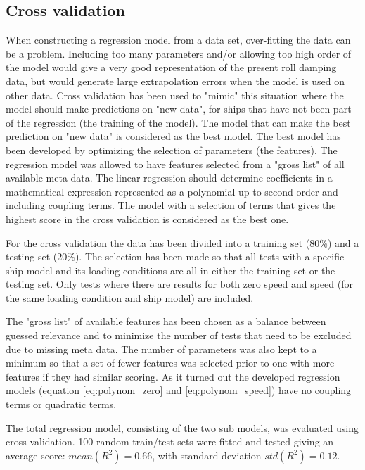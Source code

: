 


\subsection{Cross validation}
When constructing a regression model from a data set, over-fitting the data can be a problem. Including too many parameters and/or allowing too high order of the model would give a very good representation of the present roll damping data, but would generate large extrapolation errors when the model is used on other data. Cross validation has been used to "mimic" this situation where the model should make predictions on "new data", for ships that have not been part of the regression (the training of the model). The model that can make the best prediction on "new data" is considered as the best model. The best model has been developed by optimizing the selection of parameters (the features). The regression model was allowed to have features selected from a "gross list" of all available meta data. The linear regression should determine coefficients in a mathematical expression represented as a polynomial up to second order and including coupling terms. The model with a selection of terms that gives the highest score in the cross validation is considered as the best one.    

For the cross validation the data has been divided into a  training set (80\%) and a testing set (20\%). The selection has been made so that all tests with a specific ship model and its loading conditions are all in either the training set or the testing set. Only tests where there are results for both zero speed and speed (for the same loading condition and ship model) are included.

The "gross list" of available features has been chosen as a balance between guessed relevance and to minimize the number of tests that need to be excluded due to missing meta data. 
The number of parameters was also kept to a minimum so that a set of fewer features was selected prior to one with more features if they had similar scoring. As it turned out the developed regression models (equation \ref{eq:polynom_zero} and \ref{eq:polynom_speed}) have no coupling terms or quadratic terms.

The total regression model, consisting of the two sub models, was evaluated using cross validation. 100 random train/test sets were fitted and tested giving an average score: $mean(R^2)=0.66$, with standard deviation $std(R^2)=0.12$.